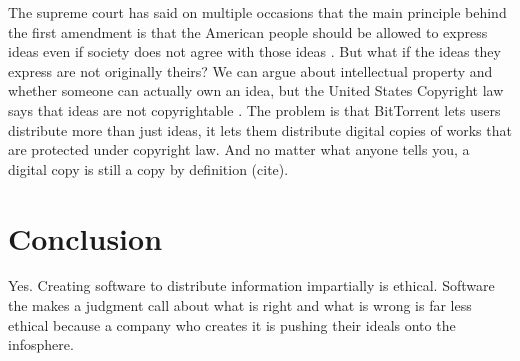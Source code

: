 \documentclass[11pt]{article}
\begin{document}
The supreme court has said on multiple occasions that the main principle behind the first amendment is that the American people should be allowed to express ideas even if society does not agree with those ideas \cite[51]{1988hustler}. But what if the ideas they express are not originally theirs? We can argue about intellectual property and whether someone can actually own an idea, but the United States Copyright law says that ideas are not copyrightable \cite{t17c1s103}. The problem is that BitTorrent lets users distribute more than just ideas, it lets them distribute digital copies of works that are protected under copyright law. And no matter what anyone tells you, a digital copy is still a copy by definition (cite).

\section{Conclusion}
Yes. Creating software to distribute information impartially is ethical. Software the makes a judgment call about what is right and what is wrong is far less ethical because a company who creates it is pushing their ideals onto the infosphere.

\newpage
\singlespacing


\end{document}
